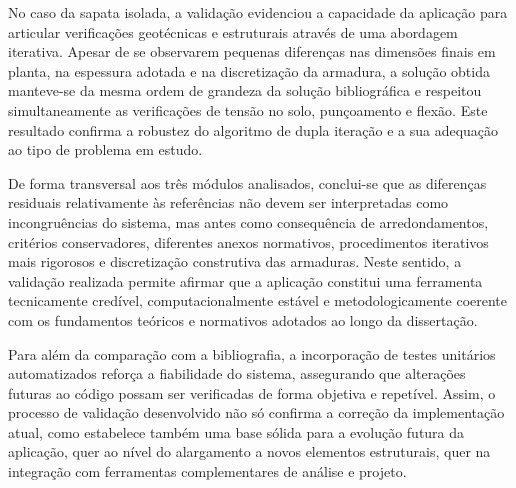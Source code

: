 No caso da sapata isolada, a validação evidenciou a capacidade da aplicação para articular verificações geotécnicas e estruturais através de uma abordagem iterativa. Apesar de se observarem pequenas diferenças nas dimensões finais em planta, na espessura adotada e na discretização da armadura, a solução obtida manteve-se da mesma ordem de grandeza da solução bibliográfica e respeitou simultaneamente as verificações de tensão no solo, punçoamento e flexão. Este resultado confirma a robustez do algoritmo de dupla iteração e a sua adequação ao tipo de problema em estudo.

De forma transversal aos três módulos analisados, conclui-se que as diferenças residuais relativamente às referências não devem ser interpretadas como incongruências do sistema, mas antes como consequência de arredondamentos, critérios conservadores, diferentes anexos normativos, procedimentos iterativos mais rigorosos e discretização construtiva das armaduras. Neste sentido, a validação realizada permite afirmar que a aplicação constitui uma ferramenta tecnicamente credível, computacionalmente estável e metodologicamente coerente com os fundamentos teóricos e normativos adotados ao longo da dissertação.

Para além da comparação com a bibliografia, a incorporação de testes unitários automatizados reforça a fiabilidade do sistema, assegurando que alterações futuras ao código possam ser verificadas de forma objetiva e repetível. Assim, o processo de validação desenvolvido não só confirma a correção da implementação atual, como estabelece também uma base sólida para a evolução futura da aplicação, quer ao nível do alargamento a novos elementos estruturais, quer na integração com ferramentas complementares de análise e projeto.